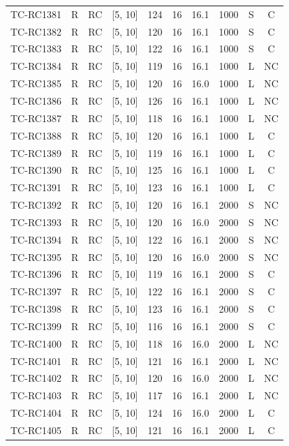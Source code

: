 \begin{longtable}{lccccccccc}
TC-RC1381 & R & RC & [5, 10] & 124 & 16 & 16.1 & 1000 & S & C \\
TC-RC1382 & R & RC & [5, 10] & 120 & 16 & 16.1 & 1000 & S & C \\
TC-RC1383 & R & RC & [5, 10] & 122 & 16 & 16.1 & 1000 & S & C \\
TC-RC1384 & R & RC & [5, 10] & 119 & 16 & 16.1 & 1000 & L & NC \\
TC-RC1385 & R & RC & [5, 10] & 120 & 16 & 16.0 & 1000 & L & NC \\
TC-RC1386 & R & RC & [5, 10] & 126 & 16 & 16.1 & 1000 & L & NC \\
TC-RC1387 & R & RC & [5, 10] & 118 & 16 & 16.1 & 1000 & L & NC \\
TC-RC1388 & R & RC & [5, 10] & 120 & 16 & 16.1 & 1000 & L & C \\
TC-RC1389 & R & RC & [5, 10] & 119 & 16 & 16.1 & 1000 & L & C \\
TC-RC1390 & R & RC & [5, 10] & 125 & 16 & 16.1 & 1000 & L & C \\
TC-RC1391 & R & RC & [5, 10] & 123 & 16 & 16.1 & 1000 & L & C \\
TC-RC1392 & R & RC & [5, 10] & 120 & 16 & 16.1 & 2000 & S & NC \\
TC-RC1393 & R & RC & [5, 10] & 120 & 16 & 16.0 & 2000 & S & NC \\
TC-RC1394 & R & RC & [5, 10] & 122 & 16 & 16.1 & 2000 & S & NC \\
TC-RC1395 & R & RC & [5, 10] & 120 & 16 & 16.0 & 2000 & S & NC \\
TC-RC1396 & R & RC & [5, 10] & 119 & 16 & 16.1 & 2000 & S & C \\
TC-RC1397 & R & RC & [5, 10] & 122 & 16 & 16.1 & 2000 & S & C \\
TC-RC1398 & R & RC & [5, 10] & 123 & 16 & 16.1 & 2000 & S & C \\
TC-RC1399 & R & RC & [5, 10] & 116 & 16 & 16.1 & 2000 & S & C \\
TC-RC1400 & R & RC & [5, 10] & 118 & 16 & 16.0 & 2000 & L & NC \\
TC-RC1401 & R & RC & [5, 10] & 121 & 16 & 16.1 & 2000 & L & NC \\
TC-RC1402 & R & RC & [5, 10] & 120 & 16 & 16.0 & 2000 & L & NC \\
TC-RC1403 & R & RC & [5, 10] & 117 & 16 & 16.1 & 2000 & L & NC \\
TC-RC1404 & R & RC & [5, 10] & 124 & 16 & 16.0 & 2000 & L & C \\
TC-RC1405 & R & RC & [5, 10] & 121 & 16 & 16.1 & 2000 & L & C \\

\end{longtable}
